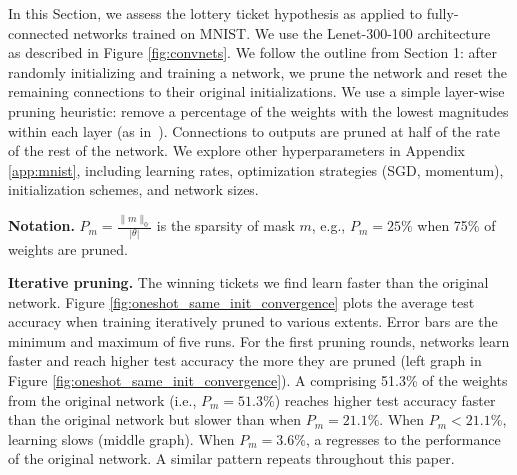 In this Section, we assess the lottery ticket hypothesis as applied to fully-connected networks trained on MNIST.
We use the Lenet-300-100 architecture~\citep{lenet} as described in Figure \ref{fig:convnets}.
We follow the outline from Section 1: after randomly initializing and training a network,
we prune the network and reset the remaining
connections to their original initializations.
We use a simple layer-wise pruning heuristic: remove a percentage of the weights with the lowest magnitudes within each layer (as in~\citet{han-pruning}). Connections
to outputs are pruned at half of the rate of the rest of the network. We explore other hyperparameters in
Appendix \ref{app:mnist}, including learning rates, optimization strategies (SGD, momentum), initialization schemes, and 
network sizes.

\textbf{Notation.} $P_m  = \frac{\lVert m \rVert_0}{|\theta|}$ is the sparsity of mask $m$, e.g.,
$P_m = 25\%$ when 75\% of weights are pruned.

\textbf{Iterative pruning.}
The winning tickets we find learn faster than the original network.
Figure
\ref{fig:oneshot_same_init_convergence} plots the average test accuracy when training {}
iteratively pruned to various
extents. Error bars are the minimum and maximum of five runs.
For the first pruning rounds, networks learn faster and reach higher test accuracy the more they are pruned
(left graph in Figure \ref{fig:oneshot_same_init_convergence}).
A {} comprising 51.3\% of the weights from the original network (i.e., $P_m = 51.3\%$) reaches higher test accuracy faster than the original network but slower
than when $P_m = 21.1\%$.
When $P_m < 21.1\%$, learning slows (middle graph). When $P_m = 3.6\%$, a {} regresses to the performance of the original network. A similar
pattern repeats throughout this paper.

